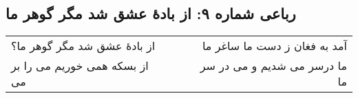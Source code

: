 \begin{center}
\section*{رباعی شماره ۹: از بادهٔ عشق شد مگر گوهر ما}
\label{sec:009}
\begin{longtable}{l p{0.5cm} r}
از بادهٔ عشق شد مگر گوهر ما؟
&&
آمد به فغان ز دست ما ساغر ما
\\
از بسکه همی خوریم می را بر می
&&
ما درسر می شدیم و می در سر ما
\\
\end{longtable}
\end{center}
